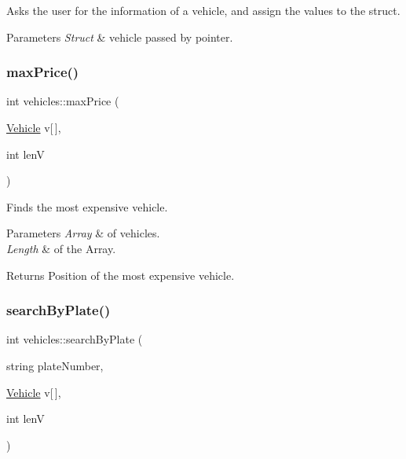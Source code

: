 Asks the user for the information of a vehicle, and assign the values to the struct. 


\begin{DoxyParams}{Parameters}
{\em Struct} & vehicle passed by pointer. \\
\hline
\end{DoxyParams}
\mbox{\label{namespacevehicles_ad8f2cef9f542cbd16ee04e8dc01c5d58}} 
\subsubsection{\texorpdfstring{max\+Price()}{maxPrice()}}
{\footnotesize\ttfamily int vehicles\+::max\+Price (\begin{DoxyParamCaption}\item[{\hyperlink{structvehicles_1_1_vehicle}{Vehicle}}]{v\mbox{[}$\,$\mbox{]},  }\item[{int}]{lenV }\end{DoxyParamCaption})}



Finds the most expensive vehicle. 


\begin{DoxyParams}{Parameters}
{\em Array} & of vehicles. \\
\hline
{\em Length} & of the Array. \\
\hline
\end{DoxyParams}
\begin{DoxyReturn}{Returns}
Position of the most expensive vehicle. 
\end{DoxyReturn}
\mbox{\label{namespacevehicles_ac3f0b7848d7ae853391e63fdf04a3aff}} 
\subsubsection{\texorpdfstring{search\+By\+Plate()}{searchByPlate()}}
{\footnotesize\ttfamily int vehicles\+::search\+By\+Plate (\begin{DoxyParamCaption}\item[{string}]{plate\+Number,  }\item[{\hyperlink{structvehicles_1_1_vehicle}{Vehicle}}]{v\mbox{[}$\,$\mbox{]},  }\item[{int}]{lenV }\end{DoxyParamCaption})}




